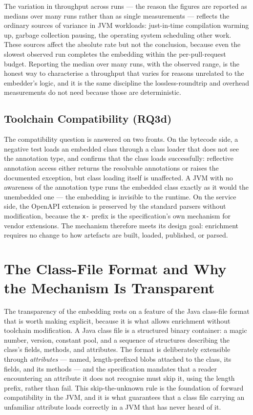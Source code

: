 The variation in throughput across runs --- the reason the figures are reported as
medians over many runs rather than as single measurements --- reflects the ordinary
sources of variance in JVM workloads: just-in-time compilation warming up, garbage
collection pausing, the operating system scheduling other work. These sources
affect the absolute rate but not the conclusion, because even the slowest observed
run completes the embedding within the per-pull-request budget. Reporting the
median over many runs, with the observed range, is the honest way to characterise a
throughput that varies for reasons unrelated to the embedder's logic, and it is the
same discipline the lossless-roundtrip and overhead measurements do not need
because those are deterministic.

\subsection{Toolchain Compatibility (RQ3d)}

The compatibility question is answered on two fronts. On the bytecode side, a
negative test loads an embedded class through a class loader that does not see
the annotation type, and confirms that the class loads successfully:
reflective annotation access either returns the resolvable annotations or raises
the documented exception, but class loading itself is unaffected. A JVM with no
awareness of the annotation type runs the embedded class exactly as it would the
unembedded one --- the embedding is invisible to the runtime. On the service
side, the OpenAPI extension is preserved by the standard parsers without
modification, because the \texttt{x-} prefix is the specification's own
mechanism for vendor extensions. The mechanism therefore meets its design goal:
enrichment requires no change to how artefacts are built, loaded, published, or
parsed.

\section{The Class-File Format and Why the Mechanism Is Transparent}
\label{sec:dist-classfile}

The transparency of the embedding rests on a feature of the Java class-file
format that is worth making explicit, because it is what allows enrichment
without toolchain modification. A Java class file is a structured binary
container: a magic number, version, constant pool, and a sequence of structures
describing the class's fields, methods, and attributes. The format is
deliberately extensible through \emph{attributes} --- named, length-prefixed
blobs attached to the class, its fields, and its methods --- and the
specification mandates that a reader encountering an attribute it does not
recognise must skip it, using the length prefix, rather than fail. This
skip-the-unknown rule is the foundation of forward compatibility in the JVM, and
it is what guarantees that a class file carrying an unfamiliar attribute loads
correctly in a JVM that has never heard of it.


